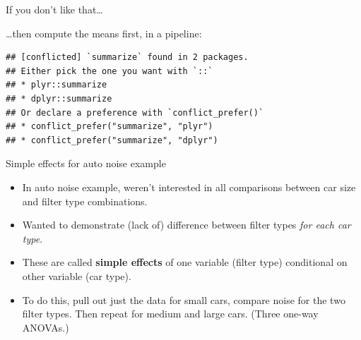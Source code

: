 \documentclass[ignorenonframetext,]{beamer}
\newenvironment{Shaded}{\begin{snugshade}}{\end{snugshade}}
\newcommand{\DataTypeTok}[1]{\textcolor[rgb]{0.13,0.29,0.53}{#1}}
\newcommand{\KeywordTok}[1]{\textcolor[rgb]{0.13,0.29,0.53}{\textbf{#1}}}
\newcommand{\NormalTok}[1]{#1}
\newcommand{\OperatorTok}[1]{\textcolor[rgb]{0.81,0.36,0.00}{\textbf{#1}}}
\newcommand{\StringTok}[1]{\textcolor[rgb]{0.31,0.60,0.02}{#1}}
\begin{document}
\begin{frame}[fragile]{If you don't like that\ldots}
\protect\hypertarget{if-you-dont-like-that}{}

\ldots then compute the means first, in a pipeline:

\footnotesize

\begin{Shaded}
\end{Shaded}

\begin{verbatim}
## [conflicted] `summarize` found in 2 packages.
## Either pick the one you want with `::` 
## * plyr::summarize
## * dplyr::summarize
## Or declare a preference with `conflict_prefer()`
## * conflict_prefer("summarize", "plyr")
## * conflict_prefer("summarize", "dplyr")
\end{verbatim}

\normalsize

\end{frame}

\begin{frame}{Simple effects for auto noise example}
\protect\hypertarget{simple-effects-for-auto-noise-example}{}

\begin{itemize}
\item
  In auto noise example, weren't interested in all comparisons between
  car size and filter type combinations.
\item
  Wanted to demonstrate (lack of) difference between filter types
  \emph{for each car type}.
\item
  These are called \textbf{simple effects} of one variable (filter type)
  conditional on other variable (car type).
\item
  To do this, pull out just the data for small cars, compare noise for
  the two filter types. Then repeat for medium and large cars. (Three
  one-way ANOVAs.)
\end{itemize}

\end{frame}
\end{document}
